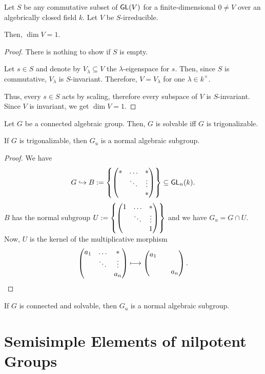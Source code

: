 \begin{lemma}
	Let $S$ be any commutative subset of $\textsf{GL}(V)$ for a finite-dimensional $0\neq V$ over an algebrically closed field $k$. Let $V$ be $S$-irreducible.
	
	Then, $\dim V = 1$.
\end{lemma}
\begin{proof}
	There is nothing to show if $S$ is empty.
	
	Let $s \in S$ and denote by $V_\lambda \subseteq V $ the $\lambda$-eigenspace for $s$. Then, since $S$ is commutative, $V_\lambda$ is $S$-invariant. Therefore, $V = V_\lambda$ for one $\lambda \in k^\times$.
	
	Thus, every $s \in S$ acts by scaling, therefore every subspace of $V$ is $S$-invariant. Since $V$ is invariant, we get $\dim V = 1$.
\end{proof}

\begin{corollary}
	Let $G$ be a connected algebraic group. Then, $G$ is solvable iff $G$ is trigonalizable.
\end{corollary}

\begin{proposition}
	If $G$ is trigonalizable, then $G_u$ is a normal algebraic subgroup.
\end{proposition}
\begin{proof}
	We have
	\[ G \overset{}{\hookrightarrow} B:= \left\lbrace
\left(\begin{matrix} * & \ldots & *\\  & \ddots & \vdots \\ & & * \end{matrix}\right)	
\right\rbrace  \subseteq \textsf{GL}_n(k). \]
$B$ has the normal subgroup $U := \left\lbrace
	\left(\begin{matrix} 1 & \ldots & *\\  & \ddots & \vdots \\ & & 1 \end{matrix}\right)	
\right\rbrace$ and we have $G_u = G \cap U$. Now, $U$ is the kernel of the multiplicative morphism
\[ 
\left(\begin{matrix} a_1 & \ldots & * \\ & \ddots & \vdots \\ & & a_n \end{matrix}\right) \longmapsto \left(\begin{matrix} a_1 &  &  \\ &  &  \\ & & a_n \end{matrix}\right).
\]
\end{proof}
\begin{corollary}
	If $G$ is connected and solvable, then $G_u$ is a normal algebraic subgroup.
\end{corollary}

\newpage
\section{Semisimple Elements of nilpotent Groups}

